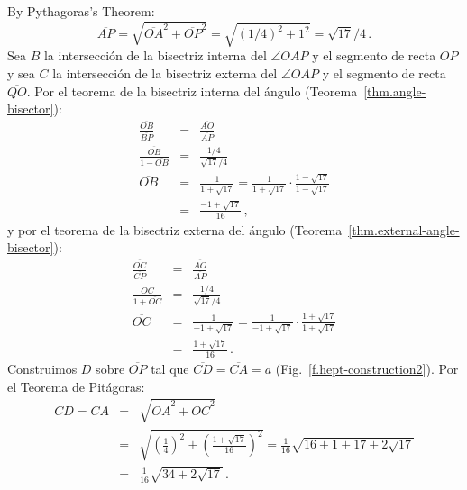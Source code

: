 By Pythagoras's Theorem:
\[
\overline{AP}=\sqrt{\overline{OA}^2+\overline{OP}^2}=\sqrt{(1/4)^2+1^2}=\sqrt{17}/4\,.
\]
Sea $B$ la intersección de la bisectriz interna del $\angle OAP$ y el segmento de recta $\overline{OP}$ y sea $C$ la intersección de la bisectriz externa del $\angle OAP$ y el segmento de recta $\overline{QO}$. Por el teorema de la bisectriz interna del ángulo (Teorema~\ref{thm.angle-bisector}):
\begin{eqnarray*}
\frac{\overline{OB}}{\overline{BP}}&=&\frac{\overline{AO}}{\overline{AP}}\\
\frac{\overline{OB}}{1-\overline{OB}}&=&\frac{1/4}{\sqrt{17}/{4}}\\
\overline{OB}&=&\frac{1}{1+\sqrt{17}}=\frac{1}{1+\sqrt{17}}\cdot \frac{1-\sqrt{17}}{1-\sqrt{17}}\\
&=&\frac{-1+\sqrt{17}}{16}\,,
\end{eqnarray*}
y por el teorema de la bisectriz externa del ángulo (Teorema~\ref{thm.external-angle-bisector}):
\begin{eqnarray*}
\frac{\overline{OC}}{\overline{CP}}&=&\frac{\overline{AO}}{\overline{AP}}\\
\frac{\overline{OC}}{1+\overline{OC}}&=&\frac{1/4}{\sqrt{17}/{4}}\\
\overline{OC}&=&\frac{1}{-1+\sqrt{17}}=\frac{1}{-1+\sqrt{17}}\cdot \frac{1+\sqrt{17}}{1+\sqrt{17}}\\
&=&\frac{1+\sqrt{17}}{16}\,.
\end{eqnarray*}
Construimos $D$ sobre $\overline{OP}$ tal que $\overline{CD}=\overline{CA}=a$ (Fig.~\ref{f.hept-construction2}). Por el Teorema de Pitágoras:
\begin{eqnarray*}
\overline{CD}=\overline{CA}&=&\sqrt{\overline{OA}^2+\overline{OC}^2}\\
&=&\sqrt{\left(\frac{1}{4}\right)^2+\left(\frac{1+\sqrt{17}}{16}\right)^2}=\frac{1}{16}\sqrt{16+1+17+2\sqrt{17}}\\
&=&\frac{1}{16}\sqrt{34+2\sqrt{17}}\,.
\end{eqnarray*}

